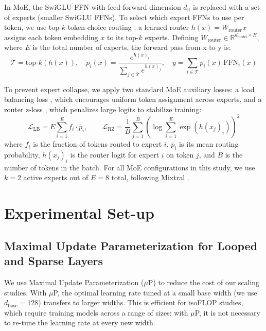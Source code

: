 \documentclass{article}
\begin{document}
In MoE, the SwiGLU FFN \citep{shazeer_glu_2020} with feed-forward dimension $d_\text{ff}$ is replaced with a set of experts (smaller SwiGLU FFNs). To select which expert FFNs to use per token, we use top-$k$ token-choice routing \citep{shazeer_outrageously_2017}: a learned router $h(x) = W_\text{router} x$ assigns each token embedding $x$ to its top-$k$ experts. Defining $W_\text{router} \in \mathbb{R}^{d_{\text{model}} \times E}$, where $E$ is the total number of experts, the forward pass from x to y is:
\[
\mathcal{T} = \text{top-}k(h(x)), \quad p_i(x) = \frac{e^{h(x)_i}}{\sum_{j \in \mathcal{T}} e^{h(x)_j}}, \quad y = \sum_{i \in \mathcal{T}} p_i(x)\, \mathrm{FFN}_i(x)
\]

To prevent expert collapse, we apply two standard MoE auxiliary losses: a load balancing loss \citep{fedus_switch_2022}, which encourages uniform token assignment across experts, and a router z-loss \citep{zoph_st-moe_2022}, which penalizes large logits to stabilize training:
\[
\mathcal{L}_{\text{LB}} = E \sum_{i=1}^{E} f_i \cdot \overline{p}_i,
\qquad
\mathcal{L}_{\text{RZ}} = \frac{1}{B} \sum_{j=1}^{B}
\left(
\log \sum_{i=1}^{E} \exp\!\left(h(x_j)_i\right)
\right)^{\!2}
\]
where $f_i$ is the fraction of tokens routed to expert $i$, $\overline{p}_i$ is its mean routing probability, $h(x_j)_i$ is the router logit for expert $i$ on token $j$, and $B$ is the number of tokens in the batch. For all MoE configurations in this study, we use $k{=}2$ active experts out of $E{=}8$ total, following Mixtral \citep{jiang_mixtral_2024}.


\section{Experimental Set-up}\label{sec:experimental-setup}

\subsection{Maximal Update Parameterization for Looped and Sparse Layers}
We use Maximal Update Parameterization ($\mu$P) \citep{yang_tensor_2022} to reduce the cost of our scaling studies. With $\mu$P, the optimal learning rate tuned at a small base width (we use $d_{\text{base}} = 128$) transfers to larger widths. This is efficient for isoFLOP studies, which require training models across a range of sizes: with $\mu$P, it is not necessary to re-tune the learning rate at every new width.
\end{document}
